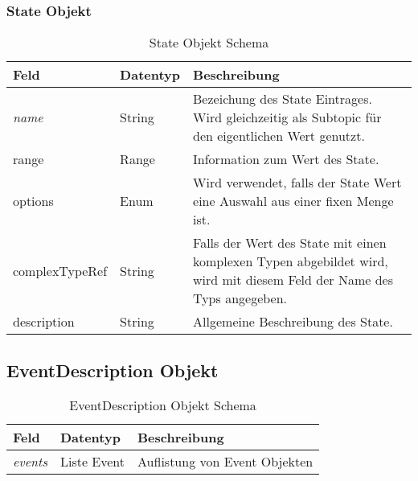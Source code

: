 \subsubsection{State Objekt}
\begin{table}[H]
\begin{tabularx}{\textwidth}{|l|l|X|}

 \hline \rowcolor{lightgray}
 {\bf Feld } & {\bf Datentyp } & {\bf Beschreibung } \\  \hline

 \textit{name}  &   String   & Bezeichung des State Eintrages. Wird gleichzeitig als Subtopic für den eigentlichen Wert genutzt.  \\ \hline
 range  &   Range   &  Information zum Wert des State.   \\ \hline
 options  &   Enum   & Wird verwendet, falls der State Wert eine Auswahl aus einer fixen Menge ist.   \\ \hline
 complexTypeRef  &   String   & Falls der Wert des State mit einen komplexen Typen abgebildet wird, wird mit diesem Feld der Name des Typs angegeben.   \\ \hline
 description  &   String   &  Allgemeine Beschreibung des State.  \\ \hline

\end{tabularx}
\caption{State Objekt Schema}
\end{table}


\subsection{EventDescription Objekt}
\begin{table}[H]
\begin{tabularx}{\textwidth}{|l|l|X|}

 \hline \rowcolor{lightgray}
 {\bf Feld } & {\bf Datentyp } & {\bf Beschreibung } \\  \hline

 \textit{events}  &   Liste Event   & Auflistung von Event Objekten   \\ \hline

\end{tabularx}
\caption{EventDescription Objekt Schema}
\end{table}


